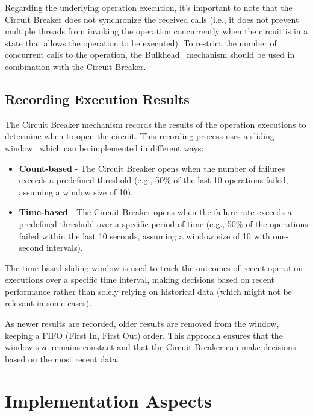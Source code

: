 Regarding the underlying operation execution,
it's important to note that the Circuit Breaker does not synchronize the received calls (i.e., it does not prevent multiple threads from invoking the operation concurrently when the circuit is in a state that allows the operation to be executed). To restrict the number of concurrent calls to the operation, the Bulkhead~\cite{microsoft-bulkhead-pattern} mechanism should be used in combination with the Circuit Breaker.

\subsection{Recording Execution Results}\label{subsec:cbreaker-recording-execution-results}

The Circuit Breaker mechanism records the results of the operation executions to determine when to open the circuit.
This recording process uses a sliding window~\cite{sliding-window} which can be implemented in different ways:

\begin{itemize}
    \item \textbf{Count-based} -
    The Circuit Breaker opens when the number of failures exceeds a predefined threshold
    (e.g., 50\% of the last 10 operations failed, assuming a window size of 10).
    \item \textbf{Time-based} -
    The Circuit Breaker opens when the failure rate exceeds a predefined threshold over a specific period of time
    (e.g., 50\% of the operations failed within the last 10 seconds,
    assuming a window size of 10 with one-second intervals).
\end{itemize}

The time-based sliding window is used
to track the outcomes of recent operation executions over a specific time interval,
making decisions based on recent performance rather than solely relying on historical data
(which might not be relevant in some cases).

As newer results are recorded, older results are removed from the window, keeping a
FIFO (First In, First Out) order.
This approach ensures that the window size remains constant and that the Circuit Breaker can make decisions based on the most recent data.


\section{Implementation Aspects}\label{sec:cbreaker-implementation-aspects}

